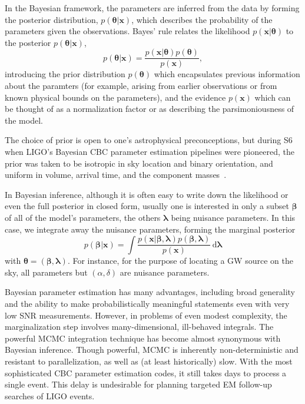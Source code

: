\documentclass{iopart}
\begin{document}
In the Bayesian framework, the parameters are inferred from the data by forming the posterior distribution, $p(\boldsymbol\theta|\mathbf x)$, which describes the probability of the parameters given the observations. Bayes' rule relates the likelihood $p(\mathbf x|\boldsymbol\theta)$ to the posterior $p(\boldsymbol\theta|\mathbf x)$,
%
\begin{equation}\label{bayes}
p(\boldsymbol\theta|\mathbf x) = \frac{p(\mathbf x|\boldsymbol\theta) p(\boldsymbol\theta)}{p(\mathbf x)},
\end{equation}
%
introducing the prior distribution $p(\boldsymbol\theta)$ which encapsulates previous information about the paramters (for example, arising from earlier observations or from known physical bounds on the parameters), and the evidence $p(\mathbf x)$ which can be thought of as a normalization factor or as describing the parsimoniousness of the model.

The choice of prior is open to one's astrophysical preconceptions, but during \ac{S6} when \ac{LIGO}'s Bayesian \ac{CBC} parameter estimation pipelines were pioneered, the prior was taken to be isotropic in sky location and binary orientation, and uniform in volume, arrival time, and the component masses~\cite{2013arXiv1304.1775T}.

In Bayesian inference, although it is often easy to write down the likelihood or even the full posterior in closed form, usually one is interested in only a subset $\boldsymbol\beta$ of all of the model's parameters, the others $\boldsymbol\lambda$ being nuisance parameters. In this case, we integrate away the nuisance parameters, forming the marginal posterior
%
\begin{equation}\label{eq:marginal-posterior}
	p(\boldsymbol\beta|\mathbf x) = \int \frac{p(\mathbf x|\boldsymbol\beta,\boldsymbol\lambda) p(\boldsymbol\beta,\boldsymbol\lambda)}{p(\mathbf x)} \,\mathrm{d}\boldsymbol\lambda
\end{equation}
%
with $\boldsymbol\theta = (\boldsymbol\beta, \boldsymbol\lambda)$. For instance, for the purpose of locating a \ac{GW} source on the sky, all parameters but $(\alpha, \delta)$ are nuisance parameters.

Bayesian parameter estimation has many advantages, including broad generality and the ability to make probabilistically meaningful statements even with very low \ac{SNR} measurements. However, in problems of even modest complexity, the marginalization step involves many-dimensional, ill-behaved integrals. The powerful \ac{MCMC} integration technique has become almost synonymous with Bayesian inference. Though powerful, \ac{MCMC} is inherently non-deterministic and resistant to parallelization, as well as (at least historically) slow. With the most sophisticated \ac{CBC} parameter estimation codes, it still takes days to process a single event. This delay is undesirable for planning targeted \ac{EM} follow\nobreakdashes-up searches of \ac{LIGO} events.
\end{document}
